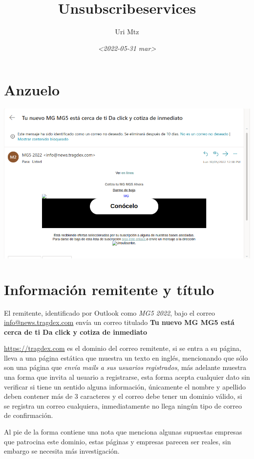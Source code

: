 \documentclass[11pt]{article}
\author{Uri Mtz}
\date{\textit{<2022-05-31 mar>}}
\title{Unsubscribeservices}
\begin{document}
\maketitle
\tableofcontents

\section{Anzuelo}
\label{sec:orge280d21}
\begin{center}
\includegraphics[width=.9\linewidth]{./assets/20220531-001335.png}
\end{center}
\section{Información remitente y título}
\label{sec:org3c87779}
El remitente, identificado por Outlook como \emph{MG5 2022}, bajo el correo \uline{info@news.tragdex.com} envía un correo titulado \textbf{Tu nuevo MG MG5 está cerca de ti Da click y cotiza de inmediato}

\url{https://tragdex.com} es el dominio del correo remitente, si se entra a su página, lleva a una página estática que muestra un texto en inglés, mencionando que sólo son una página que \emph{envía mails a sus usuarios registrados}, más adelante muestra una forma que invita al usuario a registrarse, esta forma acepta cualquier dato sin verificar si tiene un sentido alguna información, únicamente el nombre y apellido deben contener más de 3 caracteres y el correo debe tener un dominio válido, si se registra un correo cualquiera, inmediatamente no llega ningún tipo de correo de confirmación.

Al pie de la forma contiene una nota que menciona algunas supuestas empresas que patrocina este dominio, estas páginas y empresas parecen ser reales, sin embargo se necesita más investigación.
\end{document}
